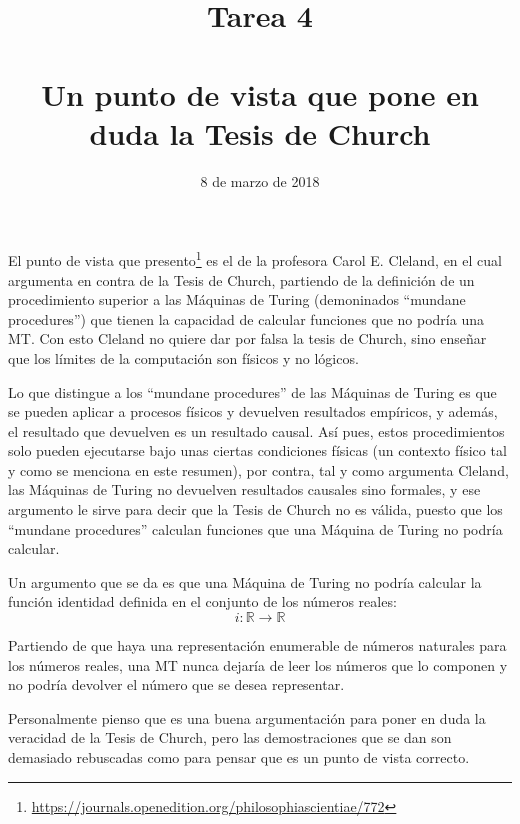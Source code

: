 \documentclass[11pt, a4paper, titlepage]{article}
\begin{document}
\title{Tarea 4 \\
  \\
  \large Un punto de vista que pone en duda la Tesis de Church}
\date{8 de marzo de 2018}
\maketitle

El punto de vista que presento\footnote{\url{https://journals.openedition.org/philosophiascientiae/772}}
es el de la profesora Carol E. Cleland, en el cual argumenta en contra de la
Tesis de Church, partiendo de la definición de un procedimiento superior a las
Máquinas de Turing (demoninados ``mundane procedures'') que tienen la capacidad
de calcular funciones que no podría una MT. Con esto Cleland no quiere dar por
falsa la tesis de Church, sino enseñar que los límites de la computación son
físicos y no lógicos.

Lo que distingue a los ``mundane procedures'' de las Máquinas de Turing es que se
pueden aplicar a procesos físicos y devuelven resultados empíricos, y además, el
resultado que devuelven es un resultado causal. Así pues, estos procedimientos
solo pueden ejecutarse bajo unas ciertas condiciones físicas (un contexto físico
tal y como se menciona en este resumen), por contra, tal y como argumenta Cleland,
las Máquinas de Turing no devuelven resultados causales sino formales, y ese
argumento le sirve para decir que la Tesis de Church no es válida, puesto
que los ``mundane procedures'' calculan funciones que una Máquina de Turing no podría
calcular.

Un argumento que se da es que una Máquina de Turing no podría calcular la función
identidad definida en el conjunto de los números reales:\\
\begin{equation}
  i \colon \mathbb{R} \to \mathbb{R}
\end{equation}

Partiendo de que haya una representación enumerable de números naturales para los
números reales, una MT nunca dejaría de leer los números que lo componen y no podría
devolver el número que se desea representar.


Personalmente pienso que es una buena argumentación para poner en duda la veracidad
de la Tesis de Church, pero las demostraciones que se dan son demasiado rebuscadas
como para pensar que es un punto de vista correcto.
\end{document}
